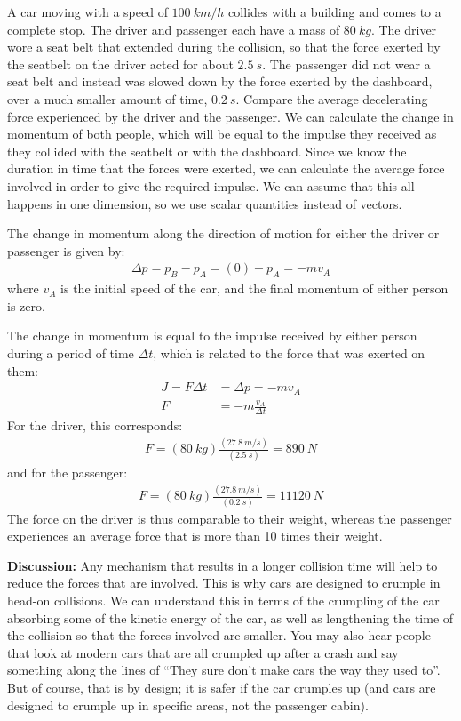 \begin{example}{A car moving with a speed of $\SI{100}{km/h}$ collides with a building and comes to a complete stop. The driver and passenger each have a mass of $\SI{80}{kg}$. The driver wore a seat belt that extended during the collision, so that the force exerted by the seatbelt on the driver acted for about $\SI{2.5}{s}$. The passenger did not wear a seat belt and instead was slowed down by the force exerted by the dashboard, over a much smaller amount of time, $\SI{0.2}{s}$. Compare the average decelerating force experienced by the driver and the passenger.}
We can calculate the change in momentum of both people, which will be equal to the impulse they received as they collided with the seatbelt or with the dashboard. Since we know the duration in time that the forces were exerted, we can calculate the average force involved in order to give the required impulse. We can assume that this all happens in one dimension, so we use scalar quantities instead of vectors.

The change in momentum along the direction of motion for either the driver or passenger is given by:
\begin{align*}
\Delta p = p_B - p_A = (0)-p_A=-mv_A
\end{align*}
where $v_A$ is the initial speed of the car, and the final momentum of either person is zero. 

The change in momentum is equal to the impulse received by either person during a period of time $\Delta t$, which is related to the force that was exerted on them:
\begin{align*}
J=F\Delta t &= \Delta p = -mv_A\\
F&=-m \frac{v_A}{\Delta t}
\end{align*}
For the driver, this corresponds:
\begin{align*}
F=(\SI{80}{kg})\frac{(\SI{27.8}{m/s})}{(\SI{2.5}{s})}=\SI{890}{N}
\end{align*}
and for the passenger:
\begin{align*}
F=(\SI{80}{kg})\frac{(\SI{27.8}{m/s})}{(\SI{0.2}{s})}=\SI{11120}{N}
\end{align*}
The force on the driver is thus comparable to their weight, whereas the passenger experiences an average force that is more than 10 times their weight.

\textbf{Discussion:} Any mechanism that results in a longer collision time will help to reduce the forces that are involved. This is why cars are designed to crumple in head-on collisions. We can understand this in terms of the crumpling of the car absorbing some of the kinetic energy of the car, as well as lengthening the time of the collision so that the forces involved are smaller. You may also hear people that look at modern cars that are all crumpled up after a crash and say something along the lines of ``They sure don't make cars the way they used to''. But of course, that is by design; it is safer if the car crumples up (and cars are designed to crumple up in specific areas, not the passenger cabin).


\end{example}
